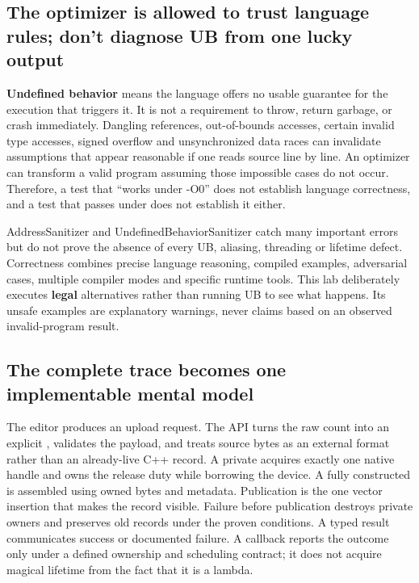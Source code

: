 \subsection{The optimizer is allowed to trust language rules; don't diagnose UB from one lucky output}\label{01-foundations-i-ch004-the-optimizer-is-allowed-to-trust-language-rules-dont-diagnose-ub-from-one-lucky-output}

\hypertarget{01-foundations-i-ch004-the-optimizer-is-allowed-to-trust-language-rules-dont-diagnose-ub-from-one-lucky-output}{}

\textbf{Undefined behavior} means the language offers no usable guarantee for the execution that triggers it. It is not a requirement to throw, return garbage, or crash immediately. Dangling references, out-of-bounds accesses, certain invalid type accesses, signed overflow and unsynchronized data races can invalidate assumptions that appear reasonable if one reads source line by line. An optimizer can transform a valid program assuming those impossible cases do not occur. Therefore, a test that ``works under -O0'' does not establish language correctness, and a test that passes under  does not establish it either.

AddressSanitizer and UndefinedBehaviorSanitizer catch many important errors but do not prove the absence of every UB, aliasing, threading or lifetime defect. Correctness combines precise language reasoning, compiled examples, adversarial cases, multiple compiler modes and specific runtime tools. This lab deliberately executes \textbf{legal} alternatives rather than running UB to see what happens. Its unsafe examples are explanatory warnings, never claims based on an observed invalid-program result.

\subsection{The complete trace becomes one implementable mental model}\label{01-foundations-i-ch004-the-complete-trace-becomes-one-implementable-mental-model}

\hypertarget{01-foundations-i-ch004-the-complete-trace-becomes-one-implementable-mental-model}{}

The editor produces an upload request. The API turns the raw count into an explicit , validates the payload, and treats source bytes as an external format rather than an already-live C++ record. A private  acquires exactly one native handle and owns the release duty while borrowing the device. A fully constructed  is assembled using owned bytes and metadata. Publication is the one vector insertion that makes the record visible. Failure before publication destroys private owners and preserves old records under the proven conditions. A typed result communicates success or documented failure. A callback reports the outcome only under a defined ownership and scheduling contract; it does not acquire magical lifetime from the fact that it is a lambda.

